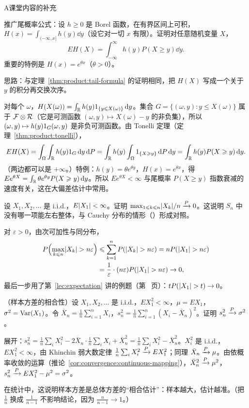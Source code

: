 \begin{exercises}{A}{课堂内容的补充}
\item\label{ex:weak-laws:A5} 推广尾概率公式：设 $h\geqslant0$ 是 Borel 函数，在有界区间上可积，$H(x)=\int_{(-\infty,x]}h(y)\dd y$（设它对一切 $x$ 有限）。证明对任意随机变量 $X$，
\[
EH(X)=\int_{-\infty}^\infty h(y)P(X\geqslant y)\dd y .
\]
重要的特例是 $H(x)=e^{\theta x}$（$\theta>0$）。
\begin{solution}
思路：与定理~\ref{thm:product:tail-formula} 的证明相同，把 $H(X)$ 写成一个关于 $y$ 的积分再交换次序。

对每个 $\omega$，$H(X(\omega))=\int_{\mathbb{R}} h(y)1_{\{y\leqslant X(\omega)\}}\,\mathrm{d} y$。集合 $G=\{(\omega,y):y\leqslant X(\omega)\}$ 属于 $\mathcal{F}\otimes\mathcal{R}$（它是可测函数 $(\omega,y)\mapsto X(\omega)-y$ 的非负集），所以 $(\omega,y)\mapsto h(y)1_G(\omega,y)$ 是非负可测函数。由 Tonelli 定理（定理~\ref{thm:product:tonelli}），
\[
EH(X)=\int_\Omega\int_{\mathbb{R}} h(y)1_G\,\mathrm{d} y\,\mathrm{d} P=\int_{\mathbb{R}} h(y)\int_\Omega1_{\{X\geqslant y\}}\,\mathrm{d} P\,\mathrm{d} y=\int_{\mathbb{R}} h(y)P(X\geqslant y)\,\mathrm{d} y .
\]
（两边都可以是 $+\infty$。）特例：$h(y)=\theta e^{\theta y}$，$H(x)=e^{\theta x}$，得 $Ee^{\theta X}=\int_{\mathbb{R}}\theta e^{\theta y}P(X\geqslant y)\,\mathrm{d} y$。所以 $Ee^{\theta X}<\infty$ 与尾概率 $P(X\geqslant y)$ 指数衰减的速度有关，这在大偏差估计中常用。
\end{solution}

\item\label{ex:weak-laws:A6} 设 $X_1,X_2,\dots$ 是 i.i.d.，$E\lvert X_1\rvert<\infty$。证明 $\max_{1\leqslant k\leqslant n}\lvert X_k\rvert/n\xrightarrow{P}0$。这说明 $S_n$ 中没有哪一项能左右整体，与 Cauchy 分布的情形（）形成对照。
\begin{solution}
对 $\varepsilon>0$，由次可加性与同分布，
\[
\begin{aligned}
P\Bigl(\max_{k\leqslant n}\lvert X_k\rvert>n\varepsilon\Bigr)&\leqslant\sum_{k=1}^nP(\lvert X_k\rvert>n\varepsilon)=nP(\lvert X_1\rvert>n\varepsilon)\\
&=\frac1\varepsilon\cdot(n\varepsilon)P(\lvert X_1\rvert>n\varepsilon)\to0,
\end{aligned}
\]
最后一步用了第~\ref{lec:expectation} 讲的例题（第~\pageref{we:expectation:tP} 页）：$tP(\lvert X_1\rvert>t)\to0$。
\end{solution}

\item\label{ex:weak-laws:A7} （样本方差的相合性）设 $X_1,X_2,\dots$ 是 i.i.d.，$EX_1^2<\infty$，$\mu=EX_1$，$\sigma^2=\operatorname{Var}(X_1)$。令 $\bar X_n=\frac1n\sum_{i=1}^nX_i$，$s_n^2=\frac1n\sum_{i=1}^n(X_i-\bar X_n)^2$。证明 $s_n^2\xrightarrow{P}\sigma^2$。
\begin{solution}
展开：$s_n^2=\frac1n\sum_iX_i^2-2\bar X_n\cdot\frac1n\sum_iX_i+\bar X_n^2=\frac1n\sum_iX_i^2-\bar X_n^2$。$X_i^2$ 是 i.i.d.，$EX_1^2<\infty$，由 Khinchin 弱大数定律 $\frac1n\sum_iX_i^2\xrightarrow{P} EX_1^2$；同理 $\bar X_n\xrightarrow{P}\mu$。由依概率收敛的运算（推论~\ref{cor:convergence:continuous-mapping}），$\bar X_n^2\xrightarrow{P}\mu^2$，$s_n^2\xrightarrow{P} EX_1^2-\mu^2=\sigma^2$。

在统计中，这说明样本方差是总体方差的“相合估计”：样本越大，估计越准。（把 $\frac1n$ 换成 $\frac1{n-1}$ 不影响结论，因为 $\frac n{n-1}\to1$。）
\end{solution}
\end{exercises}

